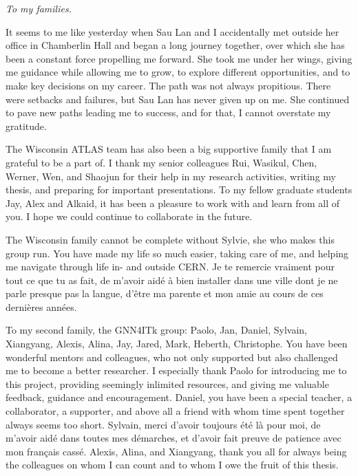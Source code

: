 \begin{dedication}
\textit{To my families.}
\end{dedication}

\begin{acknowledgments}

It seems to me like yesterday when Sau Lan and I accidentally met outside her office in Chamberlin Hall and began a long journey together, over which she has been a constant 
force propelling me forward.
She took me under her wings, giving me guidance while allowing me to grow, to explore different opportunities, and to make key decisions on my career.
The path was not always propitious. 
There were setbacks and failures, but Sau Lan has never given up on me. 
She continued to pave new paths leading me to success, and for that, I cannot overstate my gratitude.

The Wisconsin ATLAS team has also been a big supportive family that I am grateful to be a part of. 
I thank my senior colleagues Rui, Wasikul, Chen, Werner, Wen, and Shaojun for their help in my research activities, writing my thesis, and preparing for important presentations. 
To my fellow graduate students Jay, Alex and Alkaid, it has been a pleasure to work with and learn from all of you. 
I hope we could continue to collaborate in the future.

The Wisconsin family cannot be complete without Sylvie, she who makes this group run. 
You have made my life so much easier, taking care of me, and helping me navigate through life in- and outside CERN. 
Je te remercie vraiment pour tout ce que tu as fait, de m'avoir aidé à bien installer dans une ville dont je ne parle presque pas la langue, d'être ma parente et mon amie au cours de ces dernières années. 

To my second family, the GNN4ITk group: Paolo, Jan, Daniel, Sylvain, Xiangyang, Alexis, Alina, Jay, Jared, Mark, Heberth, Christophe. 
You have been wonderful mentors and colleagues, who not only supported but also challenged me to become a better researcher. 
I especially thank Paolo for introducing me to this project, providing seemingly inlimited resources, and giving me valuable feedback, guidance and encouragement.
Daniel, you have been a special teacher, a collaborator, a supporter, and above all a friend with whom time spent together always seems too short.
Sylvain, merci d'avoir toujours été là pour moi, de m'avoir aidé dans toutes mes démarches, et d'avoir fait preuve de patience avec mon français cassé. 
Alexis, Alina, and Xiangyang, thank you all for always being the colleagues on whom I can count and to whom I owe the fruit of this thesis. 


\end{acknowledgments}
